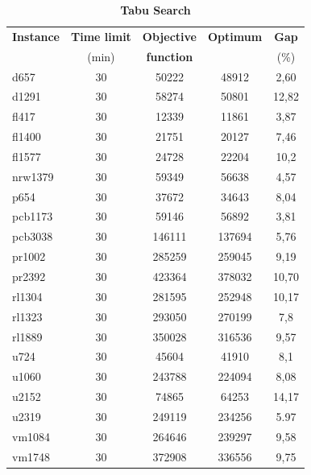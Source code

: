 \begin{table}[h!]
	\begin{center}
		\caption{\textbf{\large Tabu Search}}
		\begin{tabular}{l|c|c|c|c}
			\textbf{Instance} & \textbf{Time limit} & \textbf{Objective} & \textbf{Optimum} & \textbf{ Gap } \\
			& (min) & \textbf{function} & & (\%)\\
			\hline
			d657 & 30 & 50222 & 48912 & 2,60 \\
			d1291 & 30 & 58274 & 50801 & 12,82  \\
			fl417 & 30 & 12339 & 11861 & 3,87\\
			fl1400 & 30 & 21751 & 20127 &  7,46 \\
			fl1577 & 30 & 24728 & 22204 &  10,2\\
			nrw1379 & 30 & 59349 & 56638 & 4,57 \\
			p654 & 30 & 37672 & 34643 & 8,04 \\
			pcb1173 & 30 & 59146 & 56892 & 3,81  \\
			pcb3038 & 30 & 146111 & 137694 & 5,76  \\
			pr1002 & 30 & 285259 & 259045 & 9,19  \\
			pr2392 & 30 & 423364 & 378032 & 10,70 \\
			rl1304 & 30 & 281595 & 252948 & 10,17  \\
			rl1323 & 30  & 293050 & 270199 &  7,8 \\
			rl1889 & 30 & 350028 & 316536 & 9,57 \\
			u724 & 30 & 45604 & 41910 & 8,1 \\
			u1060 & 30 & 243788 & 224094 & 8,08  \\
			u2152 & 30 & 74865 & 64253 & 14,17 \\
			u2319 & 30 & 249119 & 234256 & 5.97 \\
			vm1084 & 30 & 264646 & 239297 & 9,58  \\
			vm1748 & 30 & 372908 & 336556 & 9,75 \\
		\end{tabular}
	\end{center}
\end{table}

